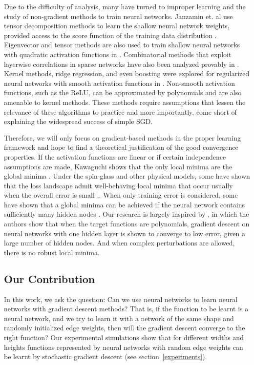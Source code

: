 Due to the difficulty of analysis, many have turned to improper learning and the study of non-gradient methods to train neural networks. Janzamin et. al use tensor decomposition methods to learn the shallow neural network weights, provided access to the score function of the training data distribution \cite{JanzaminSA15}. Eigenvector and tensor methods are also used to train shallow neural networks with quadratic activation functions in \cite{LivniSS14}. Combinatorial methods that exploit layerwise correlations in sparse networks have also been analyzed provably in \cite{AroraBGM13}. Kernel methods, ridge regression, and even boosting were explored for regularized neural networks with smooth activation functions in \cite{shalev2011learning}\cite{ZhangLWJ15}\cite{ZhangLJ15}. Non-smooth activation functions, such as the ReLU, can be approximated by polynomials and are also amenable to kernel methods\cite{GoelKKT16}. These methods require assumptions that lessen the relevance of these algorithms to practice and more importantly, come short of explaining the widespread success of simple SGD.

Therefore, we will only focus on gradient-based methods in the proper
learning framework and hope to find a theoretical justification of the
good convergence properties. If the activation functions are linear or
if certain independence assumptions are made, Kawaguchi shows that the
only local minima are the global minima \cite{Kawaguchi16a}. Under the
spin-glass and other physical models, some have shown that the loss
landscape admit well-behaving local minima that occur usually when the
overall error is small
\cite{ChoromanskaHMAL14},\cite{DauphinPGCGB14}. When only training
error is considered, some have shown that a global minima can be
achieved if the neural network contains sufficiently many hidden nodes
\cite{SoudryC16}. Our research is largely inspired by
\cite{valiant2014learning}, in which the authors show that when the
target functions are polynomials, gradient descent on neural networks
with one hidden layer is shown to converge to low error, given a large
number of hidden nodes. And when complex perturbations are allowed,
there is no robust local minima.

\subsection{Our Contribution}


In this work, we ask the question: Can we use neural networks to learn neural networks with gradient descent methods? That is, if the function to be learnt is a neural network, and we try to learn it with a network of the same shape and randomly initialized edge weights, then will the gradient descent converge to the right function? Our experimental simulations show that for different widths and heights functions represented by neural networks with random edge weights can be learnt by stochastic gradient descent (see section~\ref{experiments}).

